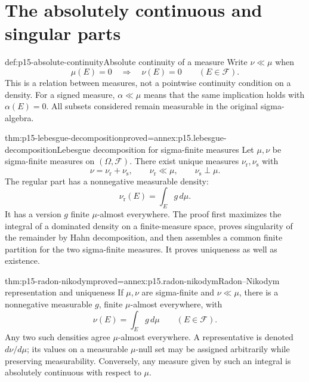 \section{The absolutely continuous and singular parts}
\label{sec:p15-lebesgue-decomposition}

\begin{hbdefinition}{def:p15-absolute-continuity}{Absolute continuity of a measure}
Write \(\nu\ll\mu\) when
\[
                     \mu(E)=0\quad\Longrightarrow\quad\nu(E)=0
                              \qquad(E\in\mathcal F).
\]
This is a relation between measures, not a pointwise continuity
condition on a density. For a signed measure, \(\alpha\ll\mu\) means
that the same implication holds with \(\alpha(E)=0\).
All subsets considered remain measurable in the original sigma-algebra.
\end{hbdefinition}

\begin{hbtheorem}{thm:p15-lebesgue-decomposition}{proved=annex:p15.lebesgue-decomposition}{Lebesgue decomposition for sigma-finite measures}
Let \(\mu,\nu\) be sigma-finite measures on \((\Omega,\mathcal F)\).
There exist unique measures \(\nu_{\mathrm r},\nu_{\mathrm s}\) with
\[
 \nu=\nu_{\mathrm r}+\nu_{\mathrm s},\qquad
 \nu_{\mathrm r}\ll\mu,\qquad \nu_{\mathrm s}\perp\mu.
\]
The regular part has a nonnegative measurable density:
\[
                         \nu_{\mathrm r}(E)=\int_E g\,d\mu.
\]
It has a version \(g\) finite \(\mu\)-almost everywhere.
The proof first maximizes the integral of a dominated density on a
finite-measure space, proves singularity of the remainder by Hahn
decomposition, and then assembles a common finite partition for the two
sigma-finite measures. It proves uniqueness as well as existence.
\end{hbtheorem}

\begin{hbtheorem}{thm:p15-radon-nikodym}{proved=annex:p15.radon-nikodym}{Radon--Nikodym representation and uniqueness}
If \(\mu,\nu\) are sigma-finite and \(\nu\ll\mu\), there is a
nonnegative measurable \(g\), finite \(\mu\)-almost everywhere, with
\[
                              \nu(E)=\int_E g\,d\mu
                                      \qquad(E\in\mathcal F).
\]
Any two such densities agree \(\mu\)-almost everywhere.
A representative is denoted \(d\nu/d\mu\); its values on a measurable
\(\mu\)-null set may be assigned arbitrarily while preserving measurability.
Conversely, any measure given by such an integral is absolutely continuous
with respect to \(\mu\).
\end{hbtheorem}

